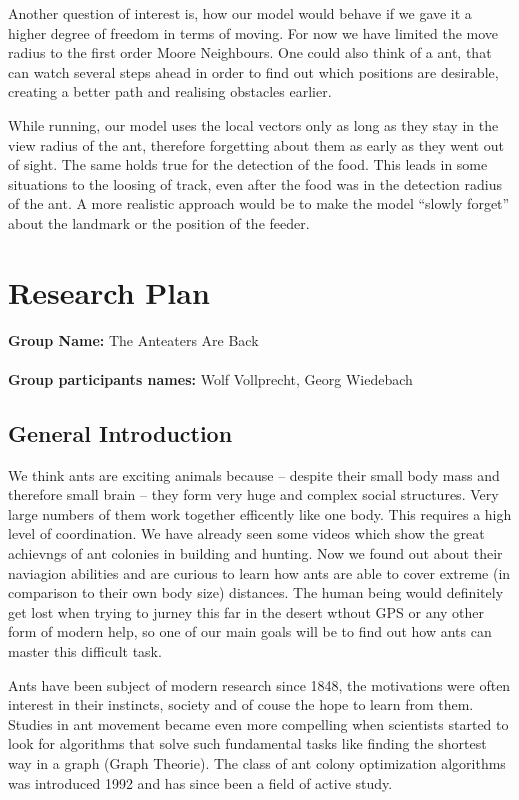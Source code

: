 \documentclass[11pt]{article}
\begin{document}
Another question of interest is, how our model would behave if we gave it a higher degree of freedom in terms of moving. For now we have limited the move radius to the first order Moore Neighbours. One could also think of a ant, that can watch several steps ahead in order to find out which positions are desirable, creating a better path and realising obstacles earlier.

While running, our model uses the local vectors only as long as they stay in the view radius of the ant, therefore forgetting about them as early as they went out of sight. The same holds true for the detection of the food. This leads in some situations to the loosing of track, even after the food was in the detection radius of the ant. A more realistic approach would be to make the model “slowly forget” about the landmark or the position of the feeder.

\newpage
\appendix

\section{Research Plan}
\textbf{Group Name:} The Anteaters Are Back\\ \\
\textbf{Group participants names:} Wolf Vollprecht, Georg Wiedebach

\subsection{General Introduction}

We think ants are exciting animals because – despite their small body mass and therefore small brain – they form very huge and complex social structures. Very large numbers of them work together efficently like one body. This requires a high level of coordination. We have already seen some videos which show the great achievngs of ant colonies in building and hunting. Now we found out about their naviagion abilities and are curious to learn how ants are able to cover extreme (in comparison to their own body size) distances. The human being would definitely get lost when trying to jurney this far in the desert wthout GPS or any other form of modern help, so one of our main goals will be to find out how ants can master this difficult task.

Ants have been subject of modern research since 1848, the motivations were often interest in their instincts, society and of couse the hope to learn from them. Studies in ant movement became even more compelling when scientists started to look for algorithms that solve such fundamental tasks like finding the shortest way in a graph (Graph Theorie). The class of ant colony optimization algorithms was introduced 1992 and has since been a field of active study.
\end{document}

